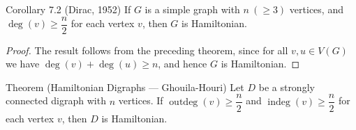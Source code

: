 \begin{thmbox}{{Corollary 7.2 (Dirac, 1952)}}
If $G$ is a simple graph with $n\ (\geq 3)$ vertices, and $\deg(v) \geq \dfrac{n}{2}$ for each vertex $v$, then $G$ is Hamiltonian.
\end{thmbox}

\begin{proof}
The result follows from the preceding theorem, since for all $v, u \in V(G)$ we have $\deg(v) + \deg(u) \geq n$, and hence $G$ is Hamiltonian.
\end{proof}

\begin{thmbox}{Theorem (Hamiltonian Digraphs --- Ghouila-Houri)}
Let $D$ be a strongly connected digraph with $n$ vertices. If $\operatorname{outdeg}(v) \geq \dfrac{n}{2}$ and $\operatorname{indeg}(v) \geq \dfrac{n}{2}$ for each vertex $v$, then $D$ is Hamiltonian.
\end{thmbox}
